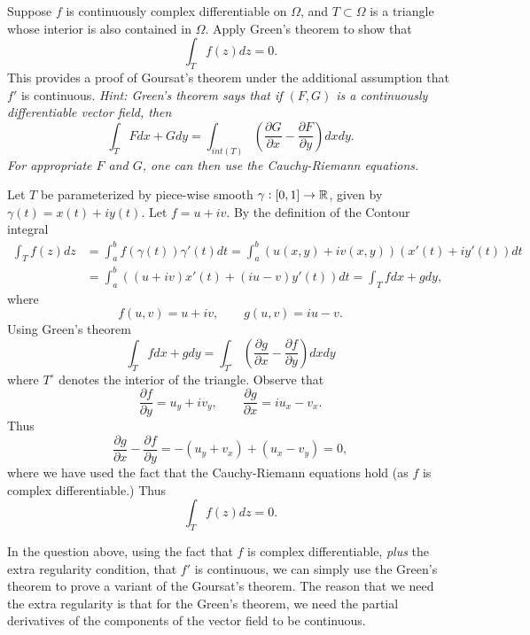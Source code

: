 \begin{problem}
	Suppose $ f $ is continuously complex differentiable on $ \Omega $, and $ T\subset\Omega $ is a triangle whose interior is also contained in $ \Omega $. Apply Green's theorem to show that
	\[ \int_T f(z)dz = 0. \]
	This provides a proof of Goursat's theorem under the additional assumption that $ f' $ is continuous. \emph{Hint: Green's theorem says that if $ (F,G) $ is a continuously differentiable vector field, then}
	\[ \int_T Fdx + Gdy = \int_{int(T)} \left( \frac{\partial G}{\partial x} - \frac{\partial F}{\partial y} \right) dx dy. \]
	\emph{For appropriate $ F $ and $ G $, one can then use the Cauchy-Riemann equations.}
\end{problem}
\begin{solution}
	Let $ T $ be parameterized by piece-wise smooth $ \gamma:[0,1] \to \mathbb{R} $, given by $ \gamma(t) = x(t) + iy(t) $. Let $ f = u+iv $. By the definition of the Contour integral
	\begin{align*}
		\int_T f(z)dz &= \int_{a}^{b} f(\gamma(t))\gamma'(t)dt = \int_{a}^{b} (u(x,y)+iv(x,y)) (x'(t)+iy'(t)) dt \\
		&=\int_{a}^{b}((u+iv)x'(t) + (iu-v)y'(t)) dt = \int_T f dx + g dy,
	\end{align*}
	where
	\[ f(u,v) = u+iv, \qquad g(u,v) = iu-v. \]
	Using Green's theorem
	\[ \int_T fdx+gdy = \int_{T^\circ} \left( \frac{\partial g}{\partial x} - \frac{\partial f}{\partial y} \right) dx dy  \]
	where $ T^\circ $ denotes the interior of the triangle. Observe that
	\[ \frac{\partial f}{\partial y} = u_y + i v_y,\qquad \frac{\partial g}{\partial x}=iu_x - v_x. \]
	Thus
	\[ \frac{\partial g}{\partial x} - \frac{\partial f}{\partial y} = - (u_y + v_x) + (u_x - v_y) = 0, \]
	where we have used the fact that the Cauchy-Riemann equations hold (as $ f $ is complex differentiable.)
	Thus
	\[ \int_T f(z) dz = 0. \]
\end{solution}

\begin{observation}
	In the question above, using the fact that $ f $ is complex differentiable, \emph{plus} the extra regularity condition, that $ f' $ is continuous, we can simply use the Green's theorem to prove a variant of the Goursat's theorem. The reason that we need the extra regularity is that for the Green's theorem, we need the partial derivatives of the components of the vector field to be continuous.
\end{observation}


